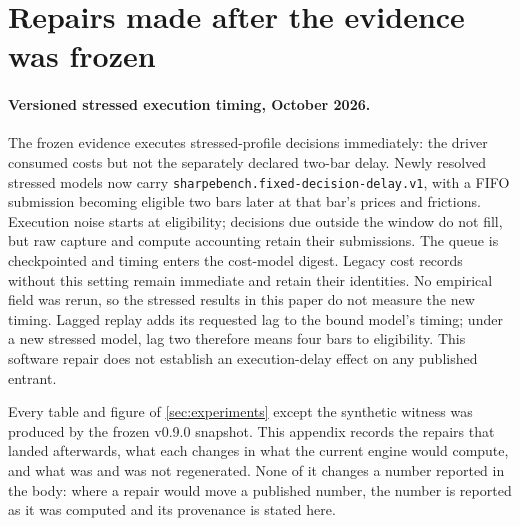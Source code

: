\section{Repairs made after the evidence was frozen}\label{app:repairs}

\paragraph{Versioned stressed execution timing, October 2026.} The frozen evidence executes stressed-profile decisions immediately: the driver consumed costs but not the separately declared two-bar delay. Newly resolved stressed models now carry \texttt{sharpebench.fixed-decision-delay.v1}, with a FIFO submission becoming eligible two bars later at that bar's prices and frictions. Execution noise starts at eligibility; decisions due outside the window do not fill, but raw capture and compute accounting retain their submissions. The queue is checkpointed and timing enters the cost-model digest. Legacy cost records without this setting remain immediate and retain their identities. No empirical field was rerun, so the stressed results in this paper do not measure the new timing. Lagged replay adds its requested lag to the bound model's timing; under a new stressed model, lag two therefore means four bars to eligibility. This software repair does not establish an execution-delay effect on any published entrant.

Every table and figure of \cref{sec:experiments} except the synthetic witness was produced by the frozen v0.9.0 snapshot. This appendix records the repairs that landed afterwards, what each changes in what the current engine would compute, and what was and was not regenerated. None of it changes a number reported in the body: where a repair would move a published number, the number is reported as it was computed and its provenance is stated here.

